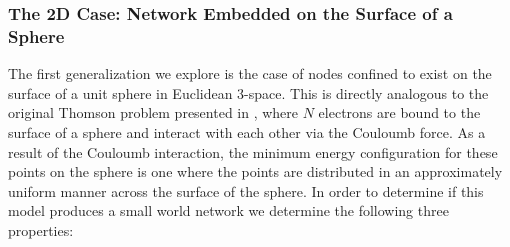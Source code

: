 \documentclass[aps,pre,reprint,superscriptaddress,amsmath,amssymb,nofootinbib]{revtex4-1}
\begin{document}
\subsubsection{The 2D Case: Network Embedded on the Surface of a Sphere}
The first generalization we explore is the case of nodes confined to exist on the surface of a unit sphere in Euclidean 3-space.
This is directly analogous to the original Thomson problem presented in \cite{thomson1904}, where $N$ electrons are bound to the surface of a sphere and interact with each other via the Couloumb force.
As a result of the Couloumb interaction, the minimum energy configuration for these points on the sphere is one where the points are distributed in an approximately uniform manner across the surface of the sphere.
In order to determine if this model produces a small world network we determine the following three properties:
\end{document}
